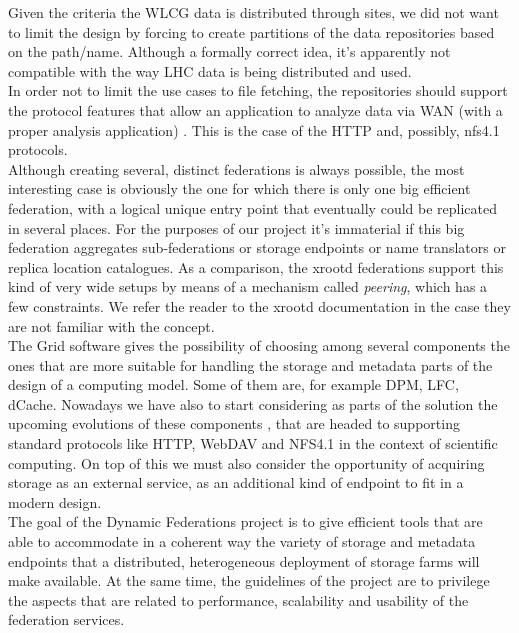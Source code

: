 \documentclass[12pt]{article} %
\begin{document}
Given the criteria the WLCG data is distributed through sites, we did not want to limit the design by forcing to create partitions of the data repositories based on the path/name. Although a formally correct idea, it's apparently not compatible with the way LHC data is being distributed and used.\\
 
 In order not to limit the use cases to file fetching, the repositories should support the protocol features that allow an application to analyze data via WAN (with a proper analysis application) \cite{xrdwan}. This is the case of the HTTP and, possibly, nfs4.1 protocols.\\

Although creating several, distinct federations is always possible, the most interesting case is obviously the one for which there is only one big efficient federation, with a logical unique entry point that eventually could be replicated in several places. For the purposes of our project it's immaterial if this big federation aggregates sub-federations or storage endpoints or name translators or replica location catalogues. As a comparison, the xrootd \cite{xrd} federations support this kind of very wide setups by means of a mechanism called \textit{peering}, which has a few constraints. We refer the reader to the xrootd documentation in the case they are not familiar with the concept.\\

The Grid software gives the possibility of choosing among several components the ones that are more suitable for handling the storage and metadata parts of the design of a computing model. Some of them are, for example DPM, LFC, dCache. Nowadays we have also to start considering as parts of the solution the upcoming evolutions of these components \cite{dpmfuture} \cite{dpmnew}, that are headed to supporting standard protocols like HTTP, WebDAV and NFS4.1 in the context of scientific computing. On top of this we must also consider the opportunity of acquiring storage as an external service, as an additional kind of endpoint to fit in a modern design.\\
The goal of the Dynamic Federations project is to give efficient tools that are able to accommodate in a coherent way the variety of storage and metadata endpoints that a distributed, heterogeneous deployment of storage farms will make available. At the same time, the guidelines of the project are to privilege the aspects that are related to performance, scalability and usability of the federation services.
\end{document}
